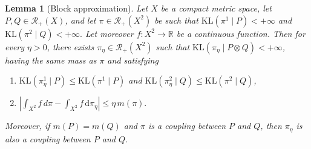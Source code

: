 \documentclass[10pt,a4paper]{amsart}
\newtheorem{lemma}{Lemma}
\begin{document}
\begin{lemma}[Block approximation]\label{lem:block}
Let \(X\) be a compact metric space, let \(P,Q \in \mathcal{R}_{+}(X)\), and let
$\pi \in \mathcal{R}_{+}(X^2)$
be such that $\mathrm{KL}(\pi^1\mid P)<+\infty$ and $\mathrm{KL}(\pi^2\mid Q)<+\infty.$
Let moreover $f:X^2 \rightarrow \mathbb{R}$ be a continuous function. Then for every \(\eta>0\), there exists $\pi_\eta \in \mathcal{R}_{+}(X^2)$
such that $\mathrm{KL}(\pi_\eta\mid P\otimes Q)<+\infty$, having the same mass as $\pi$ and satisfying
\begin{enumerate}
\item $\mathrm{KL}(\pi_\eta^1\mid P) \le \mathrm{KL}(\pi^1\mid P)$ and $\mathrm{KL}(\pi_\eta^2\mid Q)
\le
\mathrm{KL}(\pi^2\mid Q)$,
\item $
\left|
\int_{X^2} f\, d\pi
-
\int_{X^2} f\, \mathrm{d}\pi_\eta
\right|
\le \eta\, m(\pi).$
\end{enumerate}

Moreover, if \(m(P)=m(Q)\) and \(\pi\) is a coupling between \(P\) and \(Q\), then \(\pi_\eta\) is also a coupling between \(P\) and \(Q\).

\end{lemma}
\end{document}
